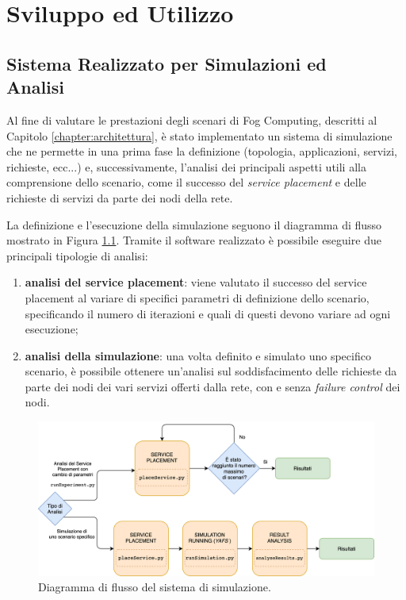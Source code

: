 \chapter{Sviluppo ed Utilizzo}
\label{chapter:implementazione}

\section[Sistema Realizzato per Simulazioni ed Analisi]{Sistema Realizzato per Simulazioni ed\\ Analisi}
\label{section:sistema_analisi}

Al fine di valutare le prestazioni degli scenari di Fog Computing, descritti al Capitolo \ref{chapter:architettura}, è stato implementato un sistema di simulazione che ne permette in una prima fase la definizione (topologia, applicazioni, servizi, richieste, ecc...) e, successivamente, l'analisi dei principali aspetti utili alla comprensione dello scenario, come il successo del \textit{service placement} e delle richieste di servizi da parte dei nodi della rete.

La definizione e l'esecuzione della simulazione seguono il diagramma di flusso mostrato in Figura \ref{fig:sim_flow_diagram}. Tramite il software realizzato è possibile eseguire due principali tipologie di analisi:
\begin{enumerate}
	\item \textbf{analisi del service placement}: viene valutato il successo del service placement al variare di specifici parametri di definizione dello scenario, specificando il numero di iterazioni e quali di questi devono variare ad ogni esecuzione;
	\item \textbf{analisi della simulazione}: una volta definito e simulato uno specifico scenario, è possibile ottenere un'analisi sul soddisfacimento delle richieste da parte dei nodi dei vari servizi offerti dalla rete, con e senza \textit{failure control} dei nodi.
\end{enumerate}


\begin{figure}[!ht]
  \includegraphics[width=14cm]{images/sim_flow_diagram}
  \centering
  \caption{Diagramma di flusso del sistema di simulazione.}
  \label{fig:sim_flow_diagram}
\end{figure}


